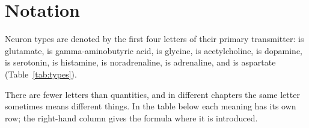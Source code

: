 \chapter{Notation}
\label{sec:notation}

Neuron types are denoted by the first four letters of their primary transmitter:  is glutamate,  is gamma-aminobutyric acid,  is glycine,  is acetylcholine,  is dopamine,  is serotonin,  is histamine,  is noradrenaline,  is adrenaline, and  is aspartate (Table~\ref{tab:types}).

There are fewer letters than quantities, and in different chapters the same letter sometimes means different things. In the table below each meaning has its own row; the right-hand column gives the formula where it is introduced.

